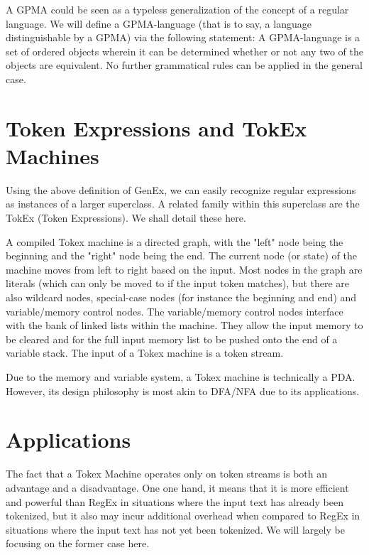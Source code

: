 \documentclass[8pt]{amsart}
\begin{document}
    A GPMA could be seen as a typeless generalization of the
    concept of a regular language. We will define a
    GPMA-language (that is to say, a language distinguishable by
    a GPMA) via the following statement: A GPMA-language is a
    set of ordered objects wherein it can be determined whether
    or not any two of the objects are equivalent. No further
    grammatical rules can be applied in the general case.

\section{Token Expressions and TokEx Machines}

    Using the above definition of GenEx, we can easily recognize
    regular expressions as instances of a larger superclass. A
    related family within this superclass are the TokEx (Token
    Expressions). We shall detail these here.

    A compiled Tokex machine is a directed graph, with the
    "left" node being the beginning and the "right" node being
    the end. The current node (or state) of the machine moves
    from left to right based on the input. Most nodes in the
    graph are literals (which can only be moved to if the input
    token matches), but there are also wildcard nodes,
    special-case nodes (for instance the beginning and end) and
    variable/memory control nodes. The variable/memory control
    nodes interface with the bank of linked lists within the
    machine. They allow the input memory to be cleared and for
    the full input memory list to be pushed onto the end of a
    variable stack. The input of a Tokex machine is a token
    stream.

    Due to the memory and variable system, a Tokex machine is
    technically a PDA. However, its design philosophy is most
    akin to DFA/NFA due to its applications.

\section{Applications}

    The fact that a Tokex Machine operates only on token streams
    is both an advantage and a disadvantage. One one hand, it
    means that it is more efficient and powerful than RegEx
    in situations where the input text has already been
    tokenized, but it also may incur additional overhead when
    compared to RegEx in situations where the input text has not
    yet been tokenized. We will largely be focusing on the
    former case here.
\end{document}
